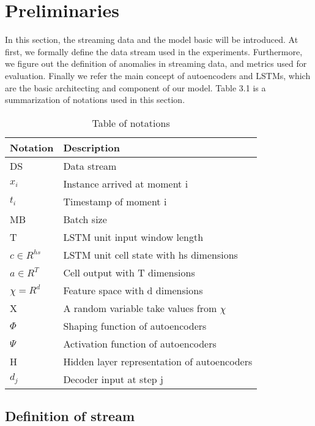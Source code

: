 \chapter{Preliminaries}
\label{chap:Preliminaries}

In this section, the streaming data and the model basic will be introduced. At first, we formally define the data stream used in the experiments. Furthermore, we figure out the definition of anomalies in streaming data, and metrics used for evaluation. Finally we refer the main concept of autoencoders and LSTMs, which are the basic architecting and component of our model. Table 3.1 is a summarization of notations used in this section.

\begin{table}[h]
\begin{center}
\begin{tabular}{|l|l|}
\hline
Notation & Description \\ \hline
DS & Data stream \\
$x_i$ & Instance arrived at moment i \\
$t_i$ & Timestamp of moment i \\
MB & Batch size	\\	
T & LSTM unit input window length \\
$c \in R^{hs}$ & LSTM unit cell state with hs dimensions \\
$a \in R^{T}$ & Cell output with T dimensions \\ 
$\chi = R^d $ & Feature space with d dimensions  \\
X & A random variable take values from $\chi$	\\
$\Phi$ & Shaping function of autoencoders	\\	
$\Psi$ & Activation function of autoencoders	 \\
H & Hidden layer representation of autoencoders  \\
$d_j$ & Decoder input at step j\\ \hline

\end{tabular}
\end{center}
\label{tab:notation}
\caption{Table of notations}
\end{table}


\section{Definition of stream}
\label{sec:Definition of stream}

